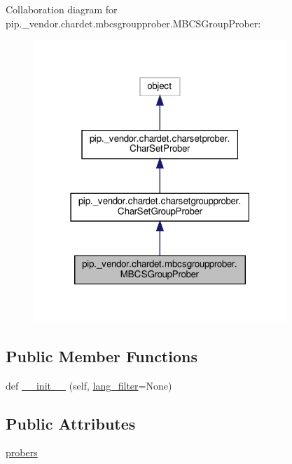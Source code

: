 Collaboration diagram for pip.\+\_\+vendor.\+chardet.\+mbcsgroupprober.\+M\+B\+C\+S\+Group\+Prober\+:
\nopagebreak
\begin{figure}[H]
\begin{center}
\leavevmode
\includegraphics[width=271pt]{classpip_1_1__vendor_1_1chardet_1_1mbcsgroupprober_1_1MBCSGroupProber__coll__graph}
\end{center}
\end{figure}
\subsection*{Public Member Functions}
\begin{DoxyCompactItemize}
\item 
def \hyperlink{classpip_1_1__vendor_1_1chardet_1_1mbcsgroupprober_1_1MBCSGroupProber_aeb02ad7a5f3bec03d577fab12c42d982}{\+\_\+\+\_\+init\+\_\+\+\_\+} (self, \hyperlink{classpip_1_1__vendor_1_1chardet_1_1charsetprober_1_1CharSetProber_aa0806228646298c509357287bcda15da}{lang\+\_\+filter}=None)
\end{DoxyCompactItemize}
\subsection*{Public Attributes}
\begin{DoxyCompactItemize}
\item 
\hyperlink{classpip_1_1__vendor_1_1chardet_1_1mbcsgroupprober_1_1MBCSGroupProber_a5eba42b203ffc3351f67e287138c9987}{probers}
\end{DoxyCompactItemize}
